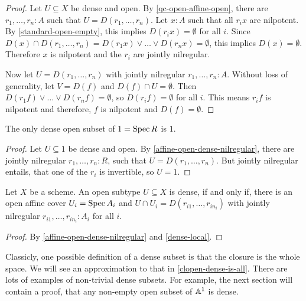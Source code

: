 \begin{proof}
  Let $U\subseteq X$ be dense and open.
  By \cref{qc-open-affine-open}, there are $r_1,\dots,r_n:A$ such that $U=D(r_1,\dots,r_n)$.
  Let $x:A$ such that all $r_ix$ are nilpotent.
  By \cref{standard-open-empty}, this implies $D(r_ix)=\emptyset$ for all $i$.
  Since $D(x)\cap D(r_1,\dots,r_n)=D(r_1x)\vee\dots\vee D(r_nx)=\emptyset$,
  this implies $D(x)=\emptyset$.
  Therefore $x$ is nilpotent and the $r_i$ are jointly nilregular.

  Now let $U=D(r_1,\dots,r_n)$ with jointly nilregular $r_1,\dots,r_n:A$.
  Without loss of generality, let $V=D(f)$ and $D(f)\cap U=\emptyset$.
  Then $D(r_1f)\vee \dots \vee D(r_nf)=\emptyset$, so $D(r_if)=\emptyset$ for all $i$.
  This means $r_if$ is nilpotent and therefore, $f$ is nilpotent and $D(f)=\emptyset$.
\end{proof}

\begin{corollary}%
  The only dense open subset of $1=\operatorname{Spec} R$ is $1$.
\end{corollary}

\begin{proof}
  Let $U\subseteq 1$ be dense and open.
  By \cref{affine-open-dense-nilregular},
  there are jointly nilregular $r_1,\dots,r_n:R$,
  such that $U=D(r_1,\dots,r_n)$.
  But jointly nilregular entails,
  that one of the $r_i$ is invertible, so $U=1$.
\end{proof}

\begin{theorem}%
  \label{dense-is-jointly-nilregular}
  Let $X$ be a scheme.
  An open subtype $U\subseteq X$ is dense,
  if and only if, there is an open affine cover $U_i=\operatorname{Spec} A_i$
  and $U\cap U_i=D(r_{i1},\dots,r_{in_i})$ with jointly nilregular $r_{i1},\dots,r_{in_i}:A_i$ for all $i$.
\end{theorem}

\begin{proof}
  By \cref{affine-open-dense-nilregular} and \cref{dense-local}.
\end{proof}

Classicly, one possible definition of a dense subset
is that the closure is the whole space.
We will see an approximation to that in \cref{clopen-dense-is-all}.
There are lots of examples of non-trivial dense subsets.
For example, the next section will contain a proof,
that any non-empty open subset of $\mathbb{A}^1$ is dense.

